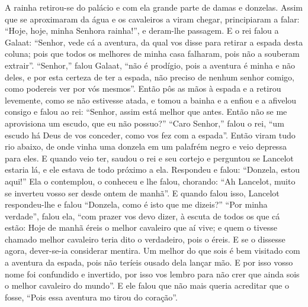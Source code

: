 A rainha retirou-se do palácio e com ela grande parte de damas e donzelas. Assim
que se aproximaram da água e os cavaleiros a viram chegar, principiaram a falar:
“Hoje, hoje, minha Senhora rainha!”, e deram-lhe passagem. E o rei falou a
Galaat: “Senhor, vede cá a aventura, da qual vos disse para retirar a espada
desta coluna; pois que todos os melhores de minha casa falharam, pois não a
souberam extrair”. “Senhor,” falou Galaat, “não é prodígio, pois a aventura é
minha e não deles, e por esta certeza de ter a espada, não preciso de nenhum
senhor comigo, como podereis ver por vós mesmos”. Então pôs as mãos à
espada e a retirou levemente, como se não estivesse atada, e tomou a bainha e a
enfiou e a afivelou consigo e falou ao rei: “Senhor, assim está melhor que
antes. Então não se me aprovisiona um escudo, que eu não possuo?” “Caro
Senhor,” falou o rei, “um escudo há Deus de vos conceder, como vos fez com a
espada”. Então viram tudo rio abaixo, de onde vinha uma donzela em um palafrém
negro e veio depressa para eles. E quando veio ter, saudou o rei e seu cortejo
e perguntou se Lancelot estaria lá, e ele estava de todo próximo a ela.
Respondeu e falou: “Donzela, estou aqui!” Ela o contemplou, o conheceu e lhe
falou, chorando: “Ah Lancelot, muito se inverteu vosso ser desde ontem de
manhã”. E quando falou isso, Lancelot respondeu-lhe e falou “Donzela, como é
isto que me dizeis?” “Por minha verdade”, falou ela, “com prazer vos devo
dizer, à escuta de todos os que cá estão: Hoje de manhã éreis o melhor
cavaleiro que aí vive; e quem o tivesse chamado melhor cavaleiro teria dito o
verdadeiro, pois o éreis. E se o dissesse agora, dever-se-ia considerar
mentira. Um melhor do que sois é bem visitado com a aventura da espada, pois
não teríeis ousado dela lançar mão. E por isso vosso nome foi confundido e
invertido, por isso vos lembro para não crer que ainda sois o melhor cavaleiro
do mundo”. E ele falou que não mais queria acreditar que o fosse, “Pois essa
aventura mo tirou do coração”. 

